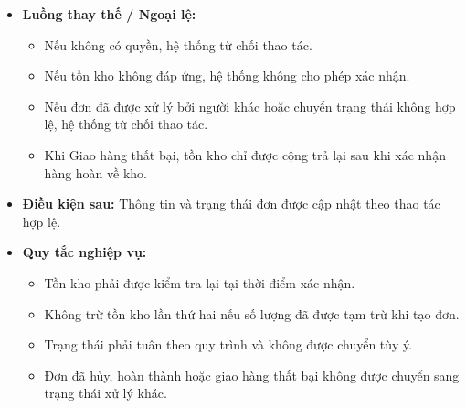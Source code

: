 \begin{itemize}
    \item \textbf{Luồng thay thế / Ngoại lệ:}
    \begin{itemize}
        \item Nếu không có quyền, hệ thống từ chối thao tác.
        \item Nếu tồn kho không đáp ứng, hệ thống không cho phép xác nhận.
        \item Nếu đơn đã được xử lý bởi người khác hoặc chuyển trạng thái không hợp lệ, hệ thống từ chối thao tác.
        \item Khi Giao hàng thất bại, tồn kho chỉ được cộng trả lại sau khi xác nhận hàng hoàn về kho.
    \end{itemize}
    \item \textbf{Điều kiện sau:} Thông tin và trạng thái đơn được cập nhật theo thao tác hợp lệ.
    \item \textbf{Quy tắc nghiệp vụ:}
    \begin{itemize}
        \item Tồn kho phải được kiểm tra lại tại thời điểm xác nhận.
        \item Không trừ tồn kho lần thứ hai nếu số lượng đã được tạm trừ khi tạo đơn.
        \item Trạng thái phải tuân theo quy trình và không được chuyển tùy ý.
        \item Đơn đã hủy, hoàn thành hoặc giao hàng thất bại không được chuyển sang trạng thái xử lý khác.
    \end{itemize}
\end{itemize}

